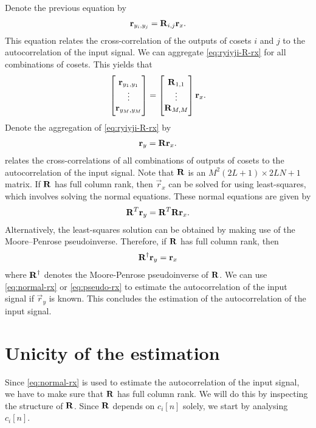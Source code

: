 \documentclass[a4paper, openany, oneside]{memoir}
\begin{document}
Denote the previous equation by
\begin{align} \label{eq:ryiyji-R-rx}
    \boldsymbol{\mathbf{r}}_{y_i,y_j} = \boldsymbol{\mathbf{R}}_{i,j} \boldsymbol{\mathbf{r}}_x.
\end{align}
This equation relates the cross-correlation of the outputs of cosets $i$ and $j$ to the autocorrelation of the input signal. We can aggregate \cref{eq:ryiyji-R-rx} for all combinations of cosets. This yields that
\begin{align*}
    \begin{bmatrix}
        \boldsymbol{\mathbf{r}}_{y_1,y_1} \\
        \vdots \\
        \boldsymbol{\mathbf{r}}_{y_M,y_M}
    \end{bmatrix} = \begin{bmatrix}
        \boldsymbol{\mathbf{R}}_{1,1} \\
        \vdots \\
        \boldsymbol{\mathbf{R}}_{M,M}
    \end{bmatrix} \boldsymbol{\mathbf{r}}_x.
\end{align*}
Denote the aggregation of \cref{eq:ryiyji-R-rx} by
\begin{align} \label{eq:ry-R-rx}
    \boldsymbol{\mathbf{r}}_y = \boldsymbol{\mathbf{R}} \boldsymbol{\mathbf{r}}_x.
\end{align}
 relates the cross-correlations of all combinations of outputs of cosets to the autocorrelation of the input signal. Note that $\boldsymbol{\mathbf{R}}$ is an $M^2(2L+1) \times 2LN+1$ matrix. If $\boldsymbol{\mathbf{R}}$ has full column rank, then $\vec{r}_x$ can be solved for using least-squares, which involves solving the normal equations. These normal equations are given by
\begin{align} \label{eq:normal-rx}
    \boldsymbol{\mathbf{R}}^T \boldsymbol{\mathbf{r}}_y = \boldsymbol{\mathbf{R}}^T \boldsymbol{\mathbf{R}} \boldsymbol{\mathbf{r}}_x.
\end{align}
Alternatively, the least-squares solution can be obtained by making use of the Moore–Penrose pseudoinverse. Therefore, if $\boldsymbol{\mathbf{R}}$ has full column rank, then
\begin{align} \label{eq:pseudo-rx}
    \boldsymbol{\mathbf{R}}^\dagger \boldsymbol{\mathbf{r}}_y = \boldsymbol{\mathbf{r}}_x
\end{align}
where $\boldsymbol{\mathbf{R}}^\dagger$ denotes the Moore-Penrose pseudoinverse of $\boldsymbol{\mathbf{R}}$. We can use \cref{eq:normal-rx} or \cref{eq:pseudo-rx} to estimate the autocorrelation of the input signal if $\vec{r}_y$ is known. This concludes the estimation of the autocorrelation of the input signal.

\section{Unicity of the estimation}
Since \cref{eq:normal-rx} is used to estimate the autocorrelation of the input signal, we have to make sure that $\boldsymbol{\mathbf{R}}$ has full column rank. We will do this by inspecting the structure of $\boldsymbol{\mathbf{R}}$. Since $\boldsymbol{\mathbf{R}}$ depends on $c_i[n]$ solely, we start by analysing $c_i[n]$.
\end{document}
